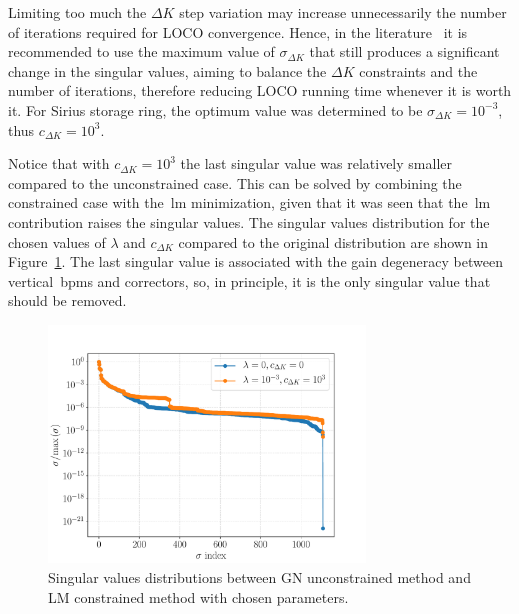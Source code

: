 Limiting too much the $\Delta K$ step variation may increase unnecessarily the number of iterations required for LOCO convergence. Hence, in the literature~\cite{icfa_huang, huang2013} it is recommended to use the maximum value of $\sigma_{\Delta K}$ that still produces a significant change in the singular values, aiming to balance the $\Delta K$ constraints and the number of iterations, therefore reducing LOCO running time whenever it is worth it. For Sirius storage ring, the optimum value was determined to be $\sigma_{\Delta K} = 10^{-3}$, thus $c_{\Delta K} = 10^{3}$.

Notice that with $c_{\Delta K}=10^{3}$ the last singular value was relatively smaller compared to the unconstrained case. This can be solved by combining the constrained case with the~\gls{lm} minimization, given that it was seen that the~\gls{lm} contribution raises the singular values. The singular values distribution for the chosen values of $\lambda$ and $c_{\Delta K}$ compared to the original distribution are shown in Figure~\ref{fig:compare_svs}. The last singular value is associated with the gain degeneracy between vertical~\glspl{bpm} and correctors, so, in principle, it is the only singular value that should be removed.
\begin{figure}
\centering
\includegraphics[width=0.75\textwidth]{figures/chosen_singular_values.pdf}
\caption{Singular values distributions between GN unconstrained method and LM constrained method with chosen parameters.}
\label{fig:compare_svs}
\end{figure}